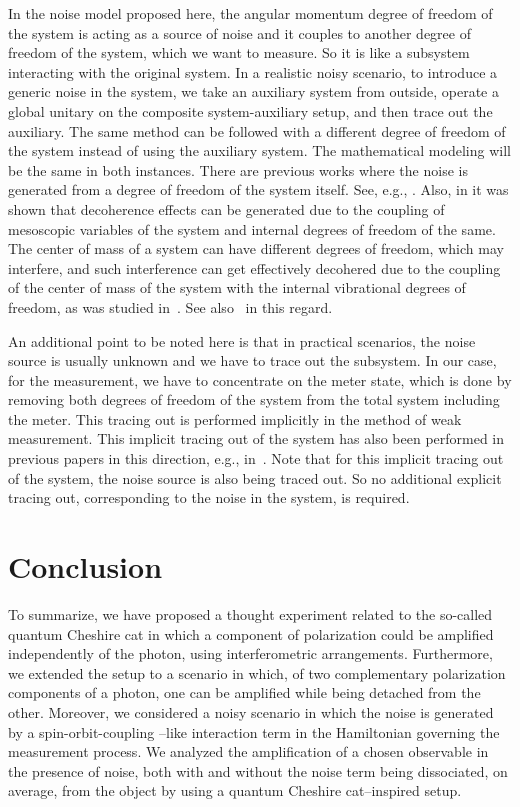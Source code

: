 \documentclass[aps,pra,showpacs,twoside,twocolumn,10pt]{revtex4-1}
\begin{document}
In the noise model proposed here, the angular momentum degree of freedom of the system is acting as a source of noise and it couples to another degree of freedom of the system, which we want to measure. So it is like a subsystem interacting with the original system. In a realistic noisy scenario, to introduce a generic noise in the system, we take an auxiliary system from outside, operate a global unitary on the composite system-auxiliary setup, and then trace out the auxiliary. The same method can be followed with a different degree of freedom of the system instead of using the auxiliary system. The mathematical modeling will be the same in both instances. There are previous works where the noise is generated from a degree of freedom of the system itself. See, e.g., \cite{Zukowski1999,Zukowski2023}. Also, in \cite{Flores} it was shown that decoherence effects can be generated due to the coupling of mesoscopic variables of the system and internal degrees of freedom of the same. The center of mass of a system can have different degrees of freedom, which may interfere, and such interference can get effectively decohered due to the coupling of the center of mass of the system with the internal vibrational degrees of freedom, as was studied in~\cite{Brun}. See also~\cite{Hillery,Nikolic} in this regard. %


An additional point to be noted here is that  in practical scenarios, the noise source is usually unknown and we have to trace out the subsystem. In our case, for the measurement, we have to concentrate on the meter state, which is done by removing both degrees of freedom of the system from the total system including the meter. This tracing out is performed implicitly in the method of weak measurement. This implicit tracing out of the system has  also been performed in previous papers in this direction, e.g., in~\cite{AAV,Duck}. Note that for this implicit tracing out of the system, the noise source is also being traced out. So no additional explicit tracing out,  corresponding to the noise in the system, is required.
\section{Conclusion}
\label{section: conclusion}
To summarize, we have proposed a thought experiment related to the so-called quantum Cheshire cat in which a component of polarization could be amplified independently of the photon, using interferometric arrangements. %
Furthermore, we extended the setup to a scenario in which, of two complementary polarization components of a photon, one  can be amplified while being detached from the other.
Moreover, we considered a noisy scenario in which the noise is generated by a spin-orbit-coupling --like interaction term in the Hamiltonian governing the measurement process. 
We analyzed the amplification of a chosen observable in the presence of noise, both with and without the noise term being 
dissociated, on average, from the object by using a quantum Cheshire cat--inspired setup. 
\end{document}
